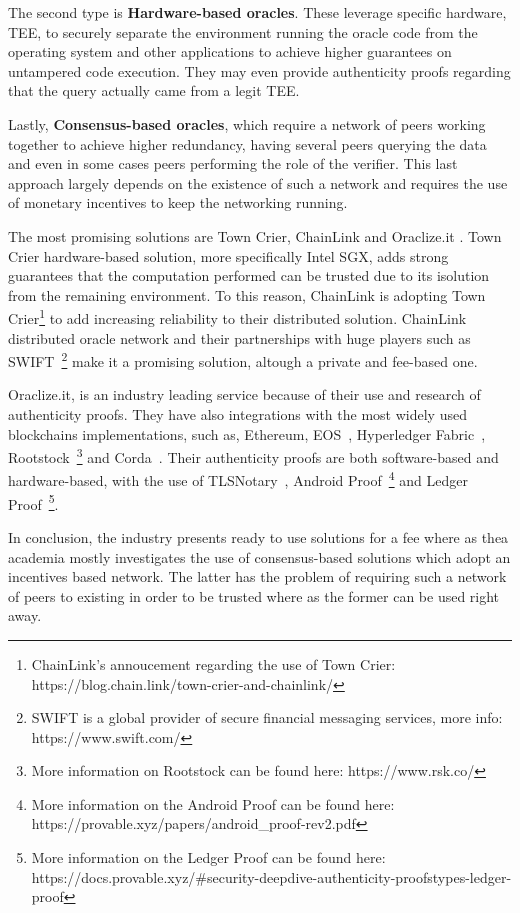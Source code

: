 \documentclass[final,3p,12pt,twocolumn]{elsarticle}
\begin{document}
The second type is \textbf{Hardware-based oracles}. These leverage specific hardware, TEE, to securely separate the environment running the oracle code from the operating system and other applications to achieve higher guarantees on untampered code execution. They may even provide authenticity proofs regarding that the query actually came from a legit TEE.

Lastly, \textbf{Consensus-based oracles}, which require a network of peers working together to achieve higher redundancy, having several peers querying the data and even in some cases peers performing the role of the verifier. This last approach largely depends on the existence of such a network and requires the use of monetary incentives to keep the networking running.

The most promising solutions are Town Crier, ChainLink and Oraclize.it .  Town Crier hardware-based solution, more specifically Intel SGX, adds strong guarantees that the computation performed can be trusted due to its isolution from the remaining environment. To this reason, ChainLink is adopting Town Crier\footnote{ChainLink's annoucement regarding the use of Town Crier: https://blog.chain.link/town-crier-and-chainlink/} to add increasing reliability to their distributed solution. ChainLink distributed oracle network and their partnerships with huge players such as SWIFT~\footnote{SWIFT is a global provider
  of secure financial messaging services, more info: https://www.swift.com/} make it a promising solution, altough a private and fee-based one.

Oraclize.it, is an industry leading service because of their use and research of authenticity proofs. They have also integrations with the most widely used blockchains implementations, such as, Ethereum, EOS~\cite{Block.one2018}, Hyperledger Fabric~\cite{Androulaki}, Rootstock~\footnote{More information on Rootstock can be found here: https://www.rsk.co/} and Corda~\cite{Brown2016}. Their authenticity proofs are both software-based and hardware-based, with the use of TLSNotary~\cite{TLSnotary}, Android Proof~\footnote{More information on the Android Proof can be found here: https://provable.xyz/papers/android\_proof-rev2.pdf} and Ledger Proof~\footnote{More information on the Ledger Proof can be found here: https://docs.provable.xyz/\#security-deepdive-authenticity-proofstypes-ledger-proof}.

In conclusion, the industry presents ready to use solutions for a fee where as thea academia mostly investigates the use of consensus-based solutions which adopt an incentives based network. The latter has the problem of requiring such a network of peers to existing in order to be trusted where as the former can be used right away.
\end{document}
